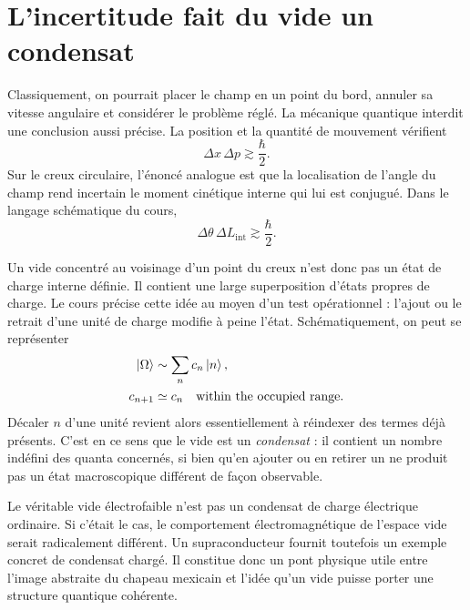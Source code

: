 \section{L’incertitude fait du vide un condensat}

Classiquement, on pourrait placer le champ en un point du bord, annuler sa vitesse angulaire et considérer le problème réglé. La mécanique quantique interdit une conclusion aussi précise. La position et la quantité de mouvement vérifient
\begin{equation}
\Delta x\,\Delta p\gtrsim\frac{\hbar}{2}.
\end{equation}
Sur le creux circulaire, l’énoncé analogue est que la localisation de l’angle du champ rend incertain le moment cinétique interne qui lui est conjugué. Dans le langage schématique du cours,
\begin{equation}
\Delta\theta\,\Delta L_{\mathrm{int}}
\gtrsim
\frac{\hbar}{2}.
\end{equation}

Un vide concentré au voisinage d’un point du creux n’est donc pas un état de charge interne définie. Il contient une large superposition d’états propres de charge. Le cours précise cette idée au moyen d’un test opérationnel : l’ajout ou le retrait d’une unité de charge modifie à peine l’état. Schématiquement, on peut se représenter
\begin{align}
\left\lvert\Omega\right\rangle
&\sim
\sum_n c_n\left\lvert n\right\rangle,
\\
c_{n+1}
&\simeq
c_n
\quad\text{within the occupied range}.
\end{align}
Décaler $n$ d’une unité revient alors essentiellement à réindexer des termes déjà présents. C’est en ce sens que le vide est un \emph{condensat} : il contient un nombre indéfini des quanta concernés, si bien qu’en ajouter ou en retirer un ne produit pas un état macroscopique différent de façon observable.

Le véritable vide électrofaible n’est pas un condensat de charge électrique ordinaire. Si c’était le cas, le comportement électromagnétique de l’espace vide serait radicalement différent. Un supraconducteur fournit toutefois un exemple concret de condensat chargé. Il constitue donc un pont physique utile entre l’image abstraite du chapeau mexicain et l’idée qu’un vide puisse porter une structure quantique cohérente.

